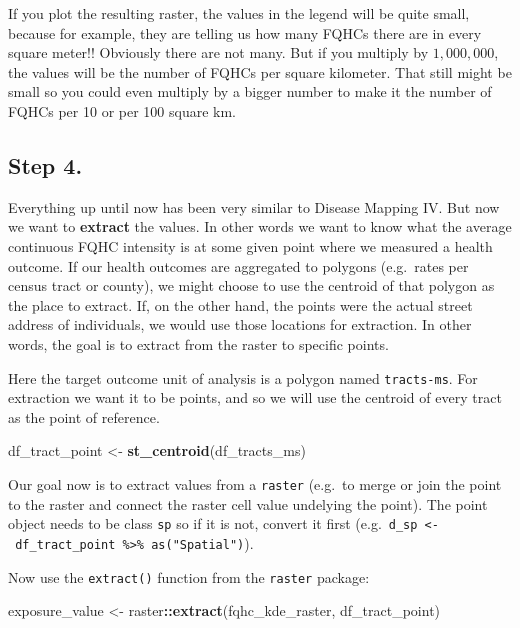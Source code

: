 \documentclass[
]{book}
\newenvironment{Shaded}{\begin{snugshade}}{\end{snugshade}}
\newcommand{\FunctionTok}[1]{\textcolor[rgb]{0.13,0.29,0.53}{\textbf{#1}}}
\newcommand{\NormalTok}[1]{#1}
\newcommand{\OtherTok}[1]{\textcolor[rgb]{0.56,0.35,0.01}{#1}}
\newcommand{\SpecialCharTok}[1]{\textcolor[rgb]{0.81,0.36,0.00}{\textbf{#1}}}
\begin{document}
If you plot the resulting raster, the values in the legend will be quite small, because for example, they are telling us how many FQHCs there are in every square meter!! Obviously there are not many. But if you multiply by \(1,000,000\), the values will be the number of FQHCs per square kilometer. That still might be small so you could even multiply by a bigger number to make it the number of FQHCs per 10 or per 100 square km.

\hypertarget{step-4.}{%
\subsection{Step 4.}\label{step-4.}}

Everything up until now has been very similar to Disease Mapping IV. But now we want to \textbf{extract} the values. In other words we want to know what the average continuous FQHC intensity is at some given point where we measured a health outcome. If our health outcomes are aggregated to polygons (e.g.~rates per census tract or county), we might choose to use the centroid of that polygon as the place to extract. If, on the other hand, the points were the actual street address of individuals, we would use those locations for extraction. In other words, the goal is to extract from the raster to specific points.

Here the target outcome unit of analysis is a polygon named \texttt{tracts-ms}. For extraction we want it to be points, and so we will use the centroid of every tract as the point of reference.

\begin{Shaded}
\begin{Highlighting}[]
\NormalTok{df\_tract\_point }\OtherTok{\textless{}{-}} \FunctionTok{st\_centroid}\NormalTok{(df\_tracts\_ms)}
\end{Highlighting}
\end{Shaded}

Our goal now is to extract values from a \texttt{raster} (e.g.~to merge or join the point to the raster and connect the raster cell value undelying the point). The point object needs to be class \texttt{sp} so if it is not, convert it first (e.g.~\texttt{d\_sp\ \textless{}-\ df\_tract\_point\ \%\textgreater{}\%\ as("Spatial")}).

Now use the \texttt{extract()} function from the \texttt{raster} package:

\begin{Shaded}
\begin{Highlighting}[]
\NormalTok{exposure\_value }\OtherTok{\textless{}{-}}\NormalTok{ raster}\SpecialCharTok{::}\FunctionTok{extract}\NormalTok{(fqhc\_kde\_raster, df\_tract\_point)}
\end{Highlighting}
\end{Shaded}
\end{document}
